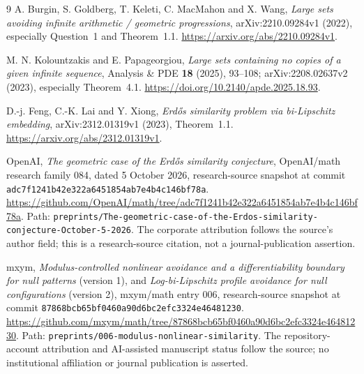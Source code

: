 \documentclass[11pt]{article}
\theoremstyle{definition}
\theoremstyle{remark}
\begin{document}
\begin{thebibliography}{9}
A. Burgin, S. Goldberg, T. Keleti, C. MacMahon and X. Wang,
\emph{Large sets avoiding infinite arithmetic / geometric progressions},
arXiv:2210.09284v1 (2022), especially Question~1 and Theorem~1.1.
\url{https://arxiv.org/abs/2210.09284v1}.

M. N. Kolountzakis and E. Papageorgiou,
\emph{Large sets containing no copies of a given infinite sequence},
Analysis \& PDE \textbf{18} (2025), 93--108;
arXiv:2208.02637v2 (2023), especially Theorem~4.1.
\url{https://doi.org/10.2140/apde.2025.18.93}.

D.-j. Feng, C.-K. Lai and Y. Xiong,
\emph{Erd\H{o}s similarity problem via bi-Lipschitz embedding},
arXiv:2312.01319v1 (2023), Theorem~1.1.
\url{https://arxiv.org/abs/2312.01319v1}.

OpenAI, \emph{The geometric case of the Erd\H{o}s similarity conjecture},
OpenAI/math research family 084, dated 5 October 2026,
research-source snapshot at commit
\texttt{adc7f1241b42e322a6451854ab7e4b4c146bf78a}.
\url{https://github.com/OpenAI/math/tree/adc7f1241b42e322a6451854ab7e4b4c146bf78a}.
Path: \nolinkurl{preprints/The-geometric-case-of-the-Erdos-similarity-conjecture-October-5-2026}.
The corporate attribution follows the source's author field; this is a
research-source citation, not a journal-publication assertion.

mxym, \emph{Modulus-controlled nonlinear avoidance and a differentiability
boundary for null patterns} (version 1), and
\emph{Log-bi-Lipschitz profile avoidance for null configurations} (version 2),
mxym/math entry 006, research-source snapshot at
commit \texttt{87868bcb65bf0460a90d6bc2efc3324e46481230}.
\url{https://github.com/mxym/math/tree/87868bcb65bf0460a90d6bc2efc3324e46481230}.
Path: \nolinkurl{preprints/006-modulus-nonlinear-similarity}.
The repository-account attribution and AI-assisted manuscript status follow
the source; no institutional affiliation or journal publication is asserted.
\end{thebibliography}
\end{document}
